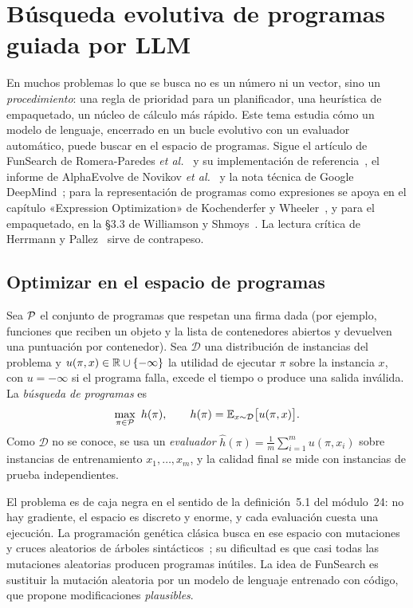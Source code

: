 \chapter{Búsqueda evolutiva de programas guiada por LLM}
\label{tema:1}

En muchos problemas lo que se busca no es un número ni un vector, sino un \emph{procedimiento}: una regla de prioridad para un planificador, una heurística de empaquetado, un núcleo de cálculo más rápido. Este tema estudia cómo un modelo de lenguaje, encerrado en un bucle evolutivo con un evaluador automático, puede buscar en el espacio de programas. Sigue el artículo de FunSearch de Romera-Paredes \emph{et al.}~\cite{funsearch} y su implementación de referencia~\cite{funsearch-code}, el informe de AlphaEvolve de Novikov \emph{et al.}~\cite{alphaevolve} y la nota técnica de Google DeepMind~\cite{ae-blog}; para la representación de programas como expresiones se apoya en el capítulo «Expression Optimization» de Kochenderfer y Wheeler~\cite{kw}, y para el empaquetado, en la §3.3 de Williamson y Shmoys~\cite{ws}. La lectura crítica de Herrmann y Pallez~\cite{hp} sirve de contrapeso.

\section{Optimizar en el espacio de programas}

\begin{definicion}\label{def:busqueda-programas}
Sea $\mathcal{P}$ el conjunto de programas que respetan una firma dada (por ejemplo, funciones que reciben un objeto y la lista de contenedores abiertos y devuelven una puntuación por contenedor). Sea $\mathcal{D}$ una distribución de instancias del problema y $u(\pi,x)\in\mathbb{R}\cup\{-\infty\}$ la utilidad de ejecutar $\pi$ sobre la instancia $x$, con $u=-\infty$ si el programa falla, excede el tiempo o produce una salida inválida. La \emph{búsqueda de programas} es
\[
\max_{\pi\in\mathcal{P}}\ h(\pi),\qquad h(\pi)=\mathbb{E}_{x\sim\mathcal{D}}\bigl[u(\pi,x)\bigr].
\]
Como $\mathcal{D}$ no se conoce, se usa un \emph{evaluador} $\hat h(\pi)=\frac1m\sum_{i=1}^{m}u(\pi,x_i)$ sobre instancias de entrenamiento $x_1,\dots,x_m$, y la calidad final se mide con instancias de prueba independientes.
\end{definicion}

El problema es de caja negra en el sentido de la definición~5.1 del módulo~24: no hay gradiente, el espacio es discreto y enorme, y cada evaluación cuesta una ejecución. La programación genética clásica busca en ese espacio con mutaciones y cruces aleatorios de árboles sintácticos~\cite{kw}; su dificultad es que casi todas las mutaciones aleatorias producen programas inútiles. La idea de FunSearch es sustituir la mutación aleatoria por un modelo de lenguaje entrenado con código, que propone modificaciones \emph{plausibles}.

